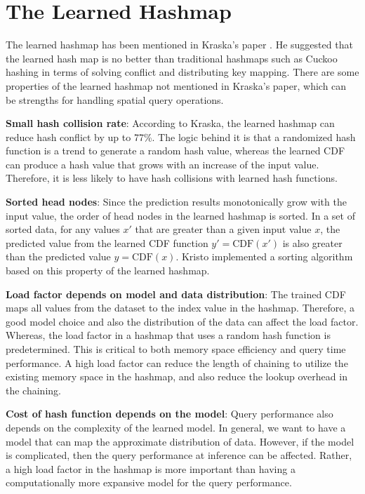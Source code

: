 \section{The Learned Hashmap} \label{the_learned_hashmap}


The learned hashmap has been mentioned in Kraska’s paper \cite{Kafle:2017dy}. He suggested that the learned hash map is no better than traditional hashmaps such as Cuckoo hashing in terms of solving conflict and distributing key mapping. There are some properties of the learned hashmap not mentioned in Kraska's paper, which can be strengths for handling spatial query operations. 


\textbf{Small hash collision rate}: According to Kraska, the learned hashmap can reduce hash conflict by up to 77\%. The logic behind it is that a randomized hash function is a trend to generate a random hash value, whereas the learned CDF can produce a hash value that grows with an increase of the input value. Therefore, it is less likely to have hash collisions with learned hash functions.

\textbf{Sorted head nodes}: Since the prediction results monotonically grow with the input value, the order of head nodes in the learned hashmap is sorted. In a set of sorted data, for any values $x\prime$ that are greater than a given input value $x$, the predicted value from the learned CDF function $y\prime = \text{CDF}(x\prime)$ is also greater than the predicted value $y = \text{CDF}(x)$. Kristo \cite{Kristo:2020it} implemented a sorting algorithm based on this property of the learned hashmap. 


\textbf{Load factor depends on model and data distribution}: The trained CDF maps all values from the dataset to the index value in the hashmap. Therefore, a good model choice and also the distribution of the data can affect the load factor. Whereas, the load factor in a hashmap that uses a random hash function is predetermined. This is critical to both memory space efficiency and query time performance. A high load factor can reduce the length of chaining to utilize the existing memory space in the hashmap, and also reduce the lookup overhead in the chaining. 

\textbf{Cost of hash function depends on the model}: Query performance also depends on the complexity of the learned model. In general, we want to have a model that can map the approximate distribution of data. However, if the model is complicated, then the query performance at inference can be affected. Rather, a high load factor in the hashmap is more important than having a computationally more expansive model for the query performance. 

